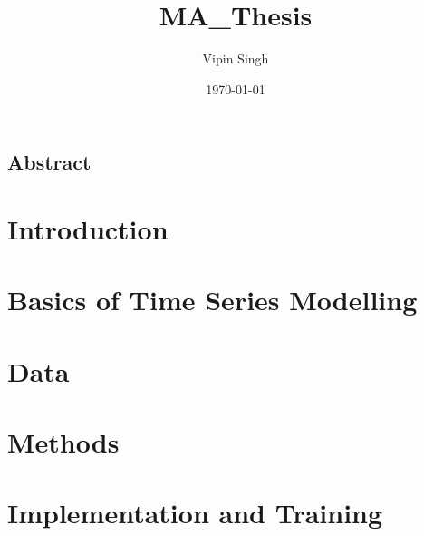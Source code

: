 \documentclass[12pt,a4paper]{report}
\author{Vipin Singh}
\title{MA_Thesis}
\date{\today}
\begin{document}
    

    {
		\FloatBarrier
		\newpage
        \setcounter{page}{2}
		\thispagestyle{plain}
		\vspace*{\fill}
			\section*{{\Large Abstract}}
			
		\vspace*{\fill}
	}

    {
        \FloatBarrier
        \newpage
        \tableofcontents
    }

	{
		\FloatBarrier %
		\newpage
		\printglossary[title=Glossary, type=\acronymtype]
		
	}

	{
		\FloatBarrier
		\chapter{Introduction}
		\label{chp:introduction}
		
	}

	{
		\FloatBarrier
		\chapter{Basics of Time Series Modelling}
		\label{chp:basicsTimeSeries}
		
	}

	{
		\FloatBarrier
		\chapter{Data}
		\label{chp:data}
		
	}

	{
		\FloatBarrier
		\chapter{Methods}
		\label{chp:methods}
		
	}

	{
		\FloatBarrier
		\chapter{Implementation and Training}
		\label{chp:implementationAndTraining}
		
	}
\end{document}
